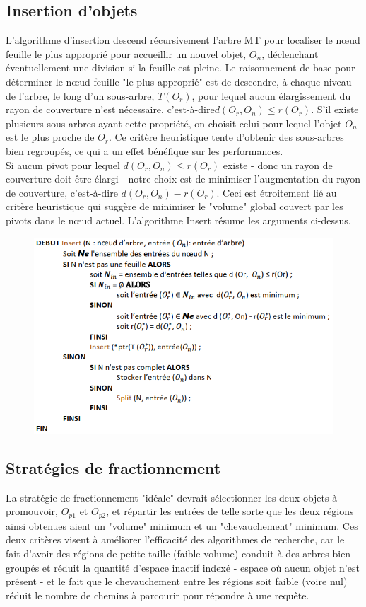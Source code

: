 \subsection{Insertion d'objets}
L'algorithme d'insertion descend récursivement l'arbre MT pour localiser le nœud feuille le plus approprié pour accueillir un nouvel objet, $ O_n $, déclenchant éventuellement une division si la feuille est pleine. Le raisonnement de base pour déterminer le nœud feuille "le plus approprié" est de descendre, à chaque niveau de l'arbre, le long d'un sous-arbre, $ T(O_r) $, pour lequel aucun élargissement du rayon de couverture n'est nécessaire, c'est-à-dire$  d(O_r, O_n) \le r(O_r) $. S'il existe plusieurs sous-arbres ayant cette propriété, on choisit celui pour lequel l'objet $ O_n $ est le plus proche de $ O_r $. Ce critère heuristique tente d'obtenir des sous-arbres bien regroupés, ce qui a un effet bénéfique sur les performances.\\

Si aucun pivot pour lequel $ d(O_r, O_n) \le r(O_r) $ existe - donc un rayon de couverture doit être élargi - notre choix est de minimiser l'augmentation du rayon de couverture, c'est-à-dire $ d(O_r, O_n)-r(O_r) $. Ceci est étroitement lié au critère heuristique qui suggère de minimiser le "volume" global couvert par les pivots dans le nœud actuel. L'algorithme Insert résume les arguments ci-dessus.
\begin{figure}[H]
	\centering
	\includegraphics[width=.9 \textwidth]{Figures/insert.png} %
\end{figure} 


\subsection{Stratégies de fractionnement}
La stratégie de fractionnement "idéale" devrait sélectionner les deux objets à promouvoir, $ O_{p1} $ et $ O_{p2} $, et répartir les entrées de telle sorte que les deux régions ainsi obtenues aient un "volume" minimum et un "chevauchement" minimum. Ces deux critères visent à améliorer l'efficacité des algorithmes de recherche, car le fait d'avoir des régions de petite taille (faible volume) conduit à des arbres bien groupés et réduit la quantité d'espace inactif indexé - espace où aucun objet n'est présent - et le fait que le chevauchement entre les régions soit faible (voire nul) réduit le nombre de chemins à parcourir pour répondre à une requête.\\

